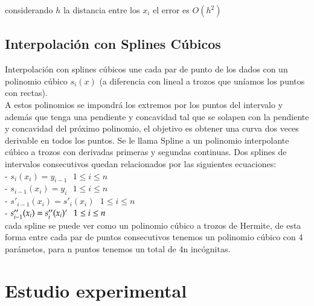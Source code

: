 \documentclass{endm}
\begin{document}
considerando $h$ la distancia entre los $x_i$ el error es $O(h^{2})$

\subsection{Interpolación con Splines Cúbicos}


Interpolación con splines cúbicos une cada par de punto de los dados con un polinomio cúbico $s_i(x)$   (a diferencia con lineal a trozos que uníamos los puntos con rectas).\\
A estos polinomios se impondrá los extremos por los puntos del intervalo y además que tenga una pendiente y concavidad tal que se solapen con la pendiente y concavidad del próximo polinomio, el objetivo es obtener una curva dos veces derivable en todos los puntos.
Se le llama Spline a un polinomio interpolante cúbico a trozos con derivadas primeras y segundas continuas.
Dos splines de intervalos consecutivos quedan relacionados por las siguientes ecuaciones:\\
- $s_i(x_i) = y_{i-1} \  \  \ 1\leq  i \leq n$\\
- $s_{i-1}(x_i) = y_{i} \  \  \ 1\leq  i \leq n$\\
- $s'_{i-1}(x_i) = s'_{i}(x_i) \  \  \ 1\leq  i \leq n$\\
- $s''_{i-1}(x_i) = s''_{i}(x_i)` \  \  \ 1\leq  i \leq n$\\

cada spline se puede ver como un polinomio cúbico a trozos de Hermite, de esta forma entre cada par de puntos consecutivos tenemos un polinomio cúbico con 4 parámetos, para n puntos tenemos un total de 4n incógnitas.

\section{Estudio experimental}
\end{document}
